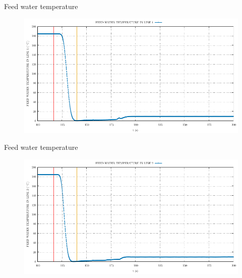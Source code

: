 \begin{frame}{Feed water temperature}
	\begin{figure}
		\centering
		\includegraphics[width=\textwidth]{./graphs/FEED WATER TEMPERATURE IN LINE 1_comp.pdf}
		
	\end{figure}
%	
\end{frame}
\begin{frame}{Feed water temperature}
	\begin{figure}
		\centering
		\includegraphics[width=\textwidth]{./graphs/FEED WATER TEMPERATURE IN LINE 2_comp.pdf}
		
	\end{figure}
	
\end{frame}
%


